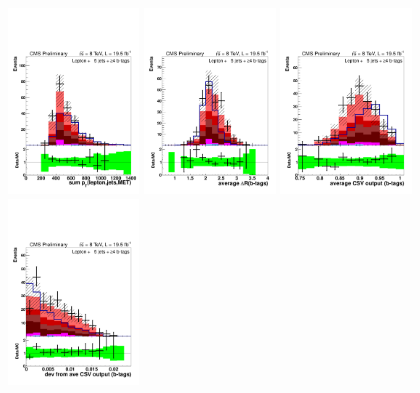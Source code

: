 \begin{figure}[hbtp]
 \begin{center}
   \includegraphics[width=0.31\textwidth]{Figures/Analysis_2_Diagrams/LJ_plots_lep/5j4t/lep_all_sum_pt_with_met_5j4t_cumulative_wRatio_noLegend_lin.pdf}
   \includegraphics[width=0.31\textwidth]{Figures/Analysis_2_Diagrams/LJ_plots_lep/5j4t/lep_ave_dR_tag_tag_5j4t_cumulative_wRatio_noLegend_lin.pdf}
   \includegraphics[width=0.31\textwidth]{Figures/Analysis_2_Diagrams/LJ_plots_lep/5j4t/lep_avg_btag_disc_btags_5j4t_cumulative_wRatio_noLegend_lin.pdf}
   \includegraphics[width=0.31\textwidth]{Figures/Analysis_2_Diagrams/LJ_plots_lep/5j4t/lep_dev_from_avg_disc_btags_5j4t_cumulative_wRatio_noLegend_lin.pdf}

\end{center}
\end{figure}
